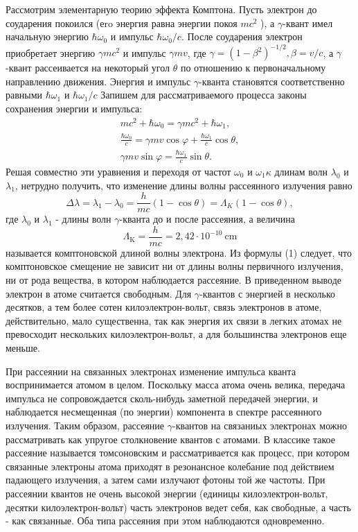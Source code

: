 \documentclass[a4paper, 12pt]{article}
\begin{document}
Рассмотрим элементарную теорию эффекта Комптона. Пусть электрон до соударения покоился (еro энергия равна энергии покоя $m c^2$ ), а $\gamma$-квант имел начальную энергию $\hbar \omega_0$ и импульс $\hbar \omega_0 / c$. После соударения электрон приобретает энергию $\gamma m c^2$ и импульс $\gamma m v$, где $\gamma=\left(1-\beta^2\right)^{-1 / 2}, \beta=v / c$, а $\gamma$-квант рассеивается на некоторый угол $\theta$ по отношению к первоначальному направлению движения. Энергия и импульс $\gamma$-кванта становятся соответственно равными $\hbar \omega_1$ и $\hbar \omega_1 / c$
Запишем для рассматриваемого процесса законы сохранения энергии и импульса:
\begin{equation*}
\begin{gathered}
m c^2+\hbar \omega_0=\gamma m c^2+\hbar \omega_1, \\
\frac{\hbar \omega_0}{c}=\gamma m v \cos \varphi+\frac{\hbar \omega_1}{c} \cos \theta, \\
\gamma m v \sin \varphi=\frac{\hbar \omega_1}{c} \sin \theta .
\end{gathered}
\end{equation*}
Решая совместно эти уравнения и переходя от частот $\omega_0$ и $\omega_1 \kappa$ длинам волн $\lambda_0$ и $\lambda_1$, нетрудно получить, что изменение длины волны рассеянного излучения равно
\begin{equation}
\Delta \lambda=\lambda_1-\lambda_0=\frac{h}{m c}(1-\cos \theta)=\Lambda_K(1-\cos \theta),
\end{equation}
где $\lambda_0$ и $\lambda_1$ - длины волн $\gamma$-кванта до и после рассеяния, а величина
\begin{equation*}
\Lambda_{\mathrm{K}}=\frac{h}{m c}=2,42 \cdot 10^{-10} \mathrm{~cm}
\end{equation*}
называется комптоновской длиной волны электрона. Из формулы (1) следует, что комптоновское смещение не зависит ни от длины волны первичного излучения, ни от рода вещества, в котором наблюдается рассеяние. В приведенном выводе электрон в атоме считается свободным. Для $\gamma$-квантов с энергией в несколько десятков, а тем более сотен килоэлектрон-вольт, связь электронов в атоме, действительно, мало существенна, так как энергия их связи в легких атомах не превосходит нескольких килоэлектрон-вольт, а для большинства электронов еще меньше.

При рассеянии на связанных электронах изменение импульса кванта воспринимается атомом в целом. Поскольку масса атома очень велика, передача импульса не сопровождается сколь-нибудь заметной передачей энергии, и наблюдается несмещенная (по энергии) компонента в спектре рассеянного излучения. Таким образом, рассеяние $\gamma$-квантов на связаниых электронах можно рассматривать как упругое столкновение квантов с атомами. В классике такое рассеяние называется томсоновским и рассматривается как процесс, при котором связанные электроны атома приходят в резонансное колебание под действием падающего излучения, а затем сами излучают фотоны той же частоты. При рассеянии квантов не очень высокой энергии (единицы килоэлектрон-вольт, десятки килоэлектрон-вольт) часть электронов ведет себя, как свободные, а часть - как связанные. Оба типа рассеяния при этом наблюдаются одновременно.
\end{document}

